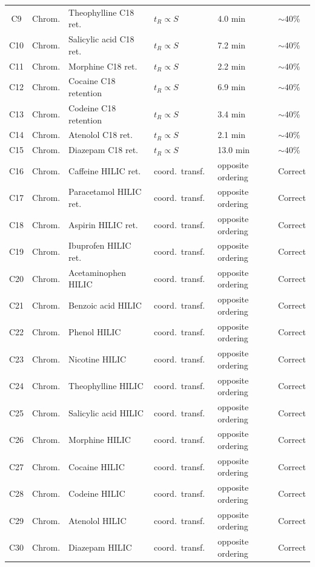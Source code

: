\begin{longtable}{@{}clp{4.2cm}p{3cm}p{3cm}l@{}}
C9  & Chrom. & Theophylline C18 ret. & $t_R\propto S$ & 4.0 min & $\sim 40$\% \\
C10 & Chrom. & Salicylic acid C18 ret. & $t_R\propto S$ & 7.2 min & $\sim 40$\% \\
C11 & Chrom. & Morphine C18 ret. & $t_R\propto S$ & 2.2 min & $\sim 40$\% \\
C12 & Chrom. & Cocaine C18 retention & $t_R\propto S$ & 6.9 min & $\sim 40$\% \\
C13 & Chrom. & Codeine C18 retention & $t_R\propto S$ & 3.4 min & $\sim 40$\% \\
C14 & Chrom. & Atenolol C18 ret. & $t_R\propto S$ & 2.1 min & $\sim 40$\% \\
C15 & Chrom. & Diazepam C18 ret. & $t_R\propto S$ & 13.0 min & $\sim 40$\% \\
C16 & Chrom. & Caffeine HILIC ret. & coord.\ transf.\ & opposite ordering & Correct \\
C17 & Chrom. & Paracetamol HILIC ret. & coord.\ transf.\ & opposite ordering & Correct \\
C18 & Chrom. & Aspirin HILIC ret. & coord.\ transf.\ & opposite ordering & Correct \\
C19 & Chrom. & Ibuprofen HILIC ret. & coord.\ transf.\ & opposite ordering & Correct \\
C20 & Chrom. & Acetaminophen HILIC & coord.\ transf.\ & opposite ordering & Correct \\
C21 & Chrom. & Benzoic acid HILIC & coord.\ transf.\ & opposite ordering & Correct \\
C22 & Chrom. & Phenol HILIC & coord.\ transf.\ & opposite ordering & Correct \\
C23 & Chrom. & Nicotine HILIC & coord.\ transf.\ & opposite ordering & Correct \\
C24 & Chrom. & Theophylline HILIC & coord.\ transf.\ & opposite ordering & Correct \\
C25 & Chrom. & Salicylic acid HILIC & coord.\ transf.\ & opposite ordering & Correct \\
C26 & Chrom. & Morphine HILIC & coord.\ transf.\ & opposite ordering & Correct \\
C27 & Chrom. & Cocaine HILIC & coord.\ transf.\ & opposite ordering & Correct \\
C28 & Chrom. & Codeine HILIC & coord.\ transf.\ & opposite ordering & Correct \\
C29 & Chrom. & Atenolol HILIC & coord.\ transf.\ & opposite ordering & Correct \\
C30 & Chrom. & Diazepam HILIC & coord.\ transf.\ & opposite ordering & Correct \\

\end{longtable}
